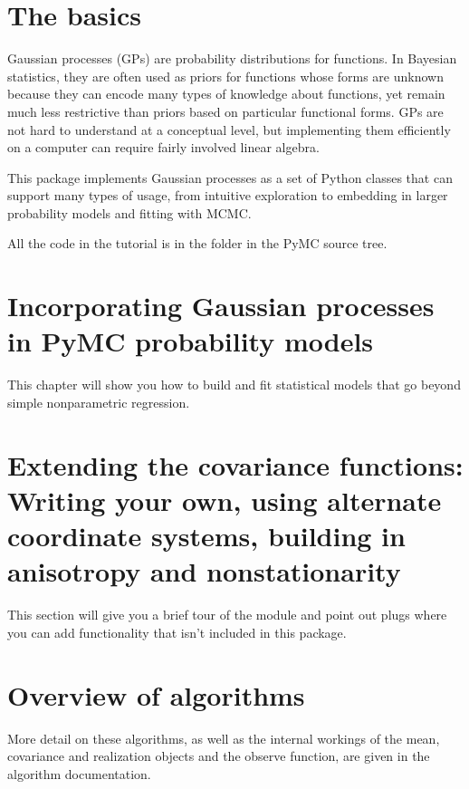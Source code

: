 \documentclass[]{manual}
\begin{document}

\chapter{The basics}\label{cha:basics}
Gaussian processes (GPs) are probability distributions for functions. In Bayesian statistics, they are often used as priors for functions whose forms are unknown because they can encode many types of knowledge about functions, yet remain much less restrictive than priors based on particular functional forms. GPs are not hard to understand at a conceptual level, but implementing them efficiently on a computer can require fairly involved linear algebra.

This package implements Gaussian processes as a set of Python classes that can support many types of usage, from intuitive exploration to embedding in larger probability models and fitting with MCMC.

All the code in the tutorial is in the folder  in the PyMC source tree.
 

\chapter{Incorporating Gaussian processes in PyMC probability models}\label{cha:PyMC}
This chapter will show you how to build and fit statistical models that go beyond simple nonparametric regression.
 

\chapter{Extending the covariance functions: Writing your own, using alternate coordinate systems, building in anisotropy and nonstationarity}\label{cha:usercov}
This section will give you a brief tour of the  module and point out plugs where you can add functionality that isn't included in this package.


\chapter{Overview of algorithms} \label{cha:numerics} 
More detail on these algorithms, as well as the internal workings of the mean, covariance and realization objects and the observe function, are given in the algorithm documentation. 
 

\nocite{*}


\end{document}
